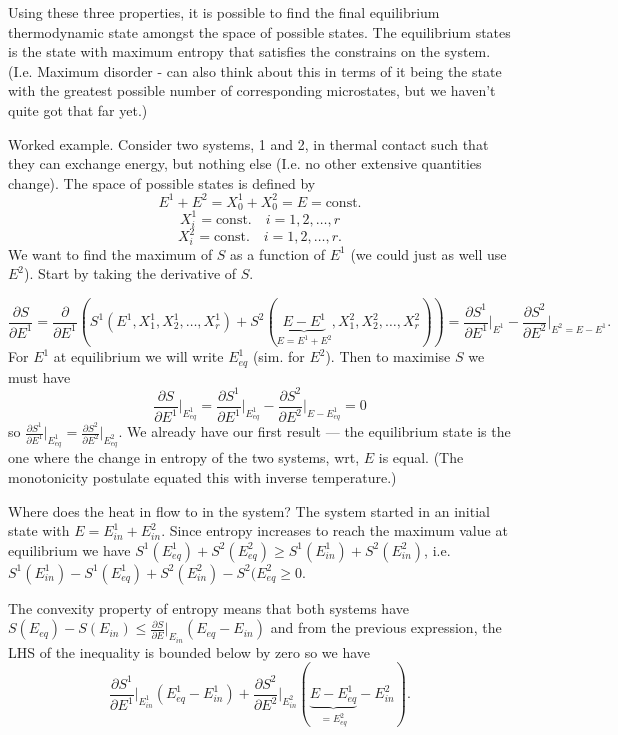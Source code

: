 Using these three properties, it is possible to find the final equilibrium thermodynamic state amongst the space of possible states. The equilibrium states is the state with maximum entropy that satisfies the constrains on the system. (I.e. Maximum disorder - can also think about this in terms of it being the state with the greatest possible number of corresponding microstates, but we haven't quite got that far yet.)

Worked example. Consider two systems, 1 and 2, in thermal contact such that they can exchange energy, but nothing else (I.e. no other extensive quantities change). The space of possible states is defined by 
$$E^1+E^2 = X_0^1+X_0^2 = E = \text{const.}$$
$$X_i^1 = \text{const.}\quad i=1,2,\ldots,r$$
$$X_i^2 = \text{const.}\quad i=1,2,\ldots,r.$$
We want to find the maximum of $S$ as a function of $E^1$ (we could just as well use $E^2$). Start by taking the derivative of $S$.

$$\frac{\partial S}{\partial E^1} = \frac{\partial}{\partial E^1}\left(S^1(E^1,X_1^1,X_2^1,\ldots,X_r^1) + S^2(\underbrace{E-E^1}_{E=E^1+E^2},X_1^2,X_2^2,\ldots,X_r^2) \right) = \frac{\partial S^1}{\partial E^1}\bigg\vert_{E^1} -  \frac{\partial S^2}{\partial E^2}\bigg\vert_{E^2=E-E^1}.$$
For $E^1$ at equilibrium we will write $E^1_{eq}$ (sim. for $E^2$). Then to maximise $S$ we must have
$$\frac{\partial S}{\partial E^1}\bigg\vert_{E^1_{eq}} = \frac{\partial S^1}{\partial E^1}\bigg\vert_{E^1_{eq}} - \frac{\partial S^2}{\partial E^2}\bigg\vert_{E-E^1_{eq}}=0$$
so $\frac{\partial S^1}{\partial E^1}\vert_{E^1_{eq}} = \frac{\partial S^2}{\partial E^2}\vert_{E_{eq}^2}$. We already have our first result --- the equilibrium state is the one where the change in entropy of the two systems, wrt, $E$ is equal. (The  monotonicity postulate equated this with inverse temperature.)

Where does the heat in flow to in the system? The system started in an initial state with $E = E^1_{in}+E^2_{in}$. Since entropy increases to reach the maximum  value at equilibrium we have $S^1(E^1_{eq}) + S^2(E^2_{eq}) \geq S^1(E^1_{in}) + S^2(E^2_{in})$, i.e. $ S^1(E^1_{in}) - S^1(E^1_{eq})  +  S^2(E^2_{in}) - S^2(E^2_{eq}\geq 0$.

The convexity property of entropy means that both systems have $S(E_{eq})-S(E_{in})\leq \frac{\partial S}{\partial E}\vert_{E_{in}}(E_{eq}-E_{in})$ and from the previous expression, the LHS of the inequality is bounded below by zero so we have
$$\frac{\partial S^1}{\partial E^1}\bigg\vert_{E^1_{in}}(E_{eq}^1-E_{in}^1) + \frac{\partial S^2}{\partial E^2}\bigg\vert_{E^2_{in}}(\underbrace{E-E_{eq}^1}_{=E^2_{eq}}-E_{in}^2).$$

